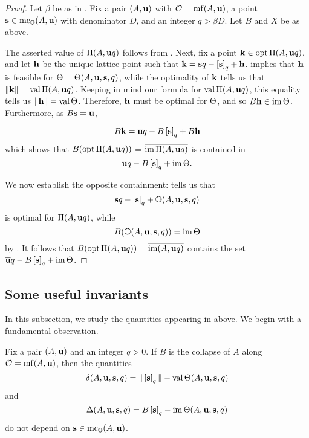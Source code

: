 \documentclass[11pt]{amsart}
\renewcommand{\!}[1]{{\color{red}\text{$\star$\,}#1\,$\star$}}
\newcommand{\ol}[1]{\overline{#1}}
\begin{document}
\begin{proof}
Let $\beta$ be as in .  Fix a pair $(A, \mathbf{u})$ with $\mathcal{O} = \operatorname{mf}(A, \mathbf{u})$, a point $\mathbf{s} \in \operatorname{mc}_{\mathbb{Q}}(A, \mathbf{u})$ with denominator $D$, and an integer $q > \beta D$.  Let $B$ and $\ol{X}$ be as above.

The asserted value of $\Pi(A, \mathbf{u}q)$ follows from .  Next, fix a point $\mathbf{k} \in \operatorname{opt} \Pi(A, \mathbf{u}q)$, and let $\mathbf{h}$ be the unique lattice point such that $\mathbf{k} = \mathbf{s}q - \left[ \mathbf{s} \right]_q + \mathbf{h}$.   implies that $\mathbf{h}$ is feasible for $\Theta = \Theta(A, \mathbf{u}, \mathbf{s}, q)$, while the optimality of $\mathbf{k}$ tells us that $\| \mathbf{k} \| = \operatorname{val} \Pi(A, \mathbf{u}q)$.  Keeping in mind our formula for $\operatorname{val} \Pi(A, \mathbf{u}q)$, this equality tells us $\| \mathbf{h} \| = \operatorname{val} \Theta$.    Therefore, $\mathbf{h}$ must be optimal for $\Theta$,  and so $B \mathbf{h} \in \operatorname{im} \Theta$.  Furthermore, as $B \vv{s} = \ol{\vv{u}}$, 

\[ B \vv{k} = \ol{\vv{u}} q - B \tail{\vv{s}}_q + B \vv{h}\]  
which shows that $B ( \operatorname{opt} \Pi(A, \mathbf{u}q))$ = $\ol{\im \IP(A, \vv{u}q)}$ is contained in 
\[ \ol{\vv{u}} q - B \tail{\vv{s}}_q + \im \ip.\]

We now establish the opposite containment:   tells us that \[  \mathbf{s}q - \left[ \mathbf{s} \right]_q + \mathbb{O}(A, \mathbf{u}, \mathbf{s}, q)\] is optimal for $\Pi(A, \mathbf{u}q)$,  while \[ B( \mathbb{O}(A, \mathbf{u}, \mathbf{s}, q)) = \operatorname{im} \Theta \] by .   It follows that $B(\opt \IP(A, \vv{u}q)) = \ol{\im(A, \vv{u}q)}$ contains the set $\ol{\vv{u}} q - B \tail{\vv{s}}_q + \im \ip$.
\end{proof}

\subsection{Some useful invariants}
\label{useful-invariants: ss}

In this subsection, we study the quantities appearing in  above.  We begin with a fundamental observation.


\begin{corollary}  
\label{independence: C} Fix a pair $(A, \mathbf{u})$ and an integer $q>0$.  If $B$ is the collapse of $A$ along $\mathcal{O} = \operatorname{mf}(A, \mathbf{u})$, then the quantities
\[   \delta(A, \mathbf{u}, \mathbf{s}, q)  = \| \left[ \mathbf{s} \right]_q \|  - \operatorname{val} \Theta(A, \mathbf{u}, \mathbf{s}, q)\] and 
\[ \Delta(A, \mathbf{u}, \mathbf{s}, q)  = B \left[ \mathbf{s} \right]_q - \operatorname{im}  \Theta( A, \mathbf{u}, \mathbf{s}, q)  \] 
do not depend on  $\mathbf{s} \in \operatorname{mc}_{\mathbb{Q}}(A, \mathbf{u})$.  
\end{corollary}
\end{document}
